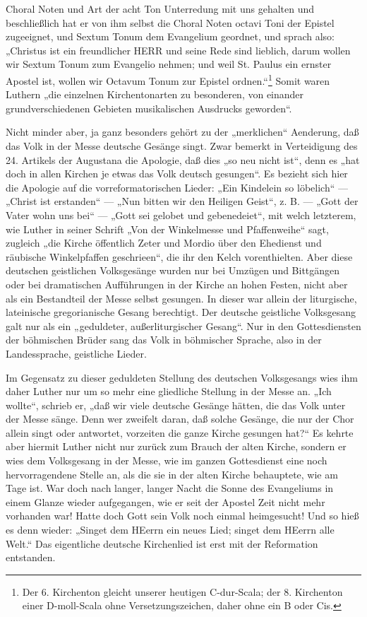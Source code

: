 Choral Noten und Art der acht Ton Unterredung mit uns gehalten und beschließlich hat er von ihm selbst die Choral Noten octavi Toni der Epistel zugeeignet, und Sextum Tonum dem Evangelium geordnet, und sprach also: „Christus ist ein freundlicher HERR und seine Rede sind lieblich, darum wollen wir Sextum Tonum zum Evangelio nehmen; und weil St. Paulus ein ernster Apostel ist, wollen wir Octavum Tonum zur Epistel ordnen.“\footnote{Der 6. Kirchenton gleicht unserer heutigen C-dur-Scala; der 8. Kirchenton einer D-moll-Scala ohne Versetzungszeichen, daher ohne ein B oder Cis.} Somit waren Luthern „die einzelnen Kirchentonarten zu besonderen, von einander grundverschiedenen Gebieten musikalischen Ausdrucks geworden“.

Nicht minder aber, ja ganz besonders gehört zu der „merklichen“ Aenderung, daß das Volk in der Messe deutsche Gesänge singt. Zwar bemerkt in Verteidigung des 24. Artikels der Augustana die Apologie, daß dies „so neu nicht ist“, denn es „hat doch in allen Kirchen je etwas das Volk deutsch gesungen“. Es bezieht sich hier die Apologie auf die vorreformatorischen Lieder: „Ein Kindelein so löbelich“ — „Christ ist erstanden“ — „Nun bitten wir den Heiligen Geist“, z. B. — „Gott der Vater wohn uns bei“ — „Gott sei gelobet und gebenedeiet“, mit welch letzterem, wie Luther in seiner Schrift „Von der Winkelmesse und Pfaffenweihe“ sagt, zugleich „die Kirche öffentlich Zeter und Mordio über den Ehedienst und räubische Winkelpfaffen geschrieen“, die ihr den Kelch vorenthielten. Aber diese deutschen geistlichen Volksgesänge wurden nur bei Umzügen und Bittgängen oder bei dramatischen Aufführungen in der Kirche an hohen Festen, nicht aber als ein Bestandteil der Messe selbst gesungen. In dieser war allein der liturgische, lateinische gregorianische Gesang berechtigt. Der deutsche geistliche Volksgesang galt nur als ein „geduldeter, außerliturgischer Gesang“. Nur in den Gottesdiensten der böhmischen Brüder sang das Volk in böhmischer Sprache, also in der Landessprache, geistliche Lieder.

Im Gegensatz zu dieser geduldeten Stellung des deutschen Volksgesangs wies ihm daher Luther nur um so mehr eine gliedliche Stellung in der Messe an. „Ich wollte“, schrieb er, „daß wir viele deutsche Gesänge hätten, die das Volk unter der Messe sänge. Denn wer zweifelt daran, daß solche Gesänge, die nur der Chor allein singt oder antwortet, vorzeiten die ganze Kirche gesungen hat?“ Es kehrte aber hiermit Luther nicht nur zurück zum Brauch der alten Kirche, sondern er wies dem Volksgesang in der Messe, wie im ganzen Gottesdienst eine noch hervorragendene Stelle an, als die sie in der alten Kirche behauptete, wie am Tage ist. War doch nach langer, langer Nacht die
Sonne des Evangeliums in einem Glanze wieder aufgegangen, wie er seit der Apostel Zeit nicht mehr vorhanden war! Hatte doch Gott sein Volk noch einmal heimgesucht! Und so hieß es denn wieder: „Singet dem HEerrn ein neues Lied; singet dem HEerrn alle Welt.“ Das eigentliche deutsche Kirchenlied ist erst mit der Reformation entstanden.

